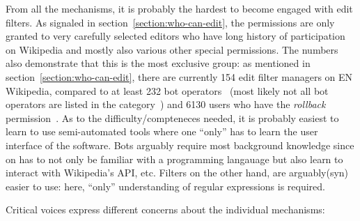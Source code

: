 From all the mechanisms, it is probably the hardest to become engaged with edit filters.
As signaled in section~\ref{section:who-can-edit}, the permissions are only granted to very carefully selected editors who have long history of participation on Wikipedia and mostly also various other special permissions.
The numbers also demonstrate that this is the most exclusive group:
as mentioned in section~\ref{section:who-can-edit}, there are currently 154 edit filter managers on EN Wikipedia,
compared to at least 232 bot operators~\cite{Wikipedia:BotOperators} (most likely not all bot operators are listed in the category~\cite{Wikipedia:FAQCategory})
and 6130 users who have the \emph{rollback} permission~\cite{Wikipedia:Rollback}.
As to the difficulty/compteneces needed, it is probably easiest to learn to use semi-automated tools where one ``only'' has to learn the user interface of the software.
Bots arguably require most background knowledge since on has to not only be familiar with a programming langauage but also learn to interact with Wikipedia's API, etc.
Filters on the other hand, are arguably(syn) easier to use: here, ``only'' understanding of regular expressions is required.

Critical voices express different concerns about the individual mechanisms:

